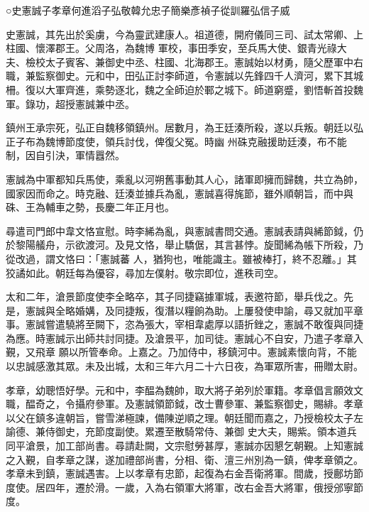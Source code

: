 
\begin{pinyinscope}

 ○史憲誠子孝章何進滔子弘敬韓允忠子簡樂彥禎子從訓羅弘信子威



 史憲誠，其先出於奚虜，今為靈武建康人。祖道德，開府儀同三司、試太常卿、上柱國、懷澤郡王。父周洛，為魏博
 軍校，事田季安，至兵馬大使、銀青光祿大夫、檢校太子賓客、兼御史中丞、柱國、北海郡王。憲誠始以材勇，隨父歷軍中右職，兼監察御史。元和中，田弘正討李師道，令憲誠以先鋒四千人濟河，累下其城柵。復以大軍齊進，乘勢逐北，魏之全師迫於鄆之城下。師道窮蹙，劉悟斬首投魏軍。錄功，超授憲誠兼中丞。



 鎮州王承宗死，弘正自魏移領鎮州。居數月，為王廷湊所殺，遂以兵叛。朝廷以弘正子布為魏博節度使，領兵討伐，俾復父冤。時幽
 州硃克融援助廷湊，布不能制，因自引決，軍情囂然。



 憲誠為中軍都知兵馬使，乘亂以河朔舊事動其人心，諸軍即擁而歸魏，共立為帥，國家因而命之。時克融、廷湊並據兵為亂，憲誠喜得旄節，雖外順朝旨，而中與硃、王為輔車之勢，長慶二年正月也。



 尋遣司門郎中韋文恪宣慰。時李絺為亂，與憲誠書問交通。憲誠表請與絺節鉞，仍於黎陽艤舟，示欲渡河。及見文恪，舉止驕倨，其言甚悖。旋聞絺為帳下所殺，乃從改過，謂文恪曰：「憲誠蕃
 人，猶狗也，唯能識主。雖被棒打，終不忍離。」其狡譎如此。朝廷每為優容，尋加左僕射。敬宗即位，進秩司空。



 太和二年，滄景節度使李全略卒，其子同捷竊據軍城，表邀符節，舉兵伐之。先是，憲誠與全略婚媾，及同捷叛，復潛以糧餉為助。上屢發使申諭，尋又就加平章事。憲誠嘗遣驍將至闕下，恣為張大，宰相韋處厚以語折銼之，憲誠不敢復與同捷為應。時憲誠示出師共討同捷。及滄景平，加司徒。憲誠心不自安，乃遣子孝章入覲，又飛章
 願以所管奉命。上嘉之。乃加侍中，移鎮河中。憲誠素懷向背，不能以忠誠感激其眾。未及出城，太和三年六月二十六日夜，為軍眾所害，冊贈太尉。



 孝章，幼聰悟好學。元和中，李醖為魏帥，取大將子弟列於軍籍。孝章倡言願效文職，醖奇之，令攝府參軍。及憲誠領節鉞，改士曹參軍、兼監察御史，賜緋。孝章以父在鎮多違朝旨，嘗雪涕極諫，備陳逆順之理。朝廷聞而嘉之，乃授檢校太子左諭德、兼侍御史，充節度副使。累遷至散騎常侍、兼御
 史大夫，賜紫。領本道兵同平滄景，加工部尚書。尋請赴闕，文宗慰勞甚厚，憲誠亦因懇乞朝覲。上知憲誠之入覲，自孝章之謀，遂加禮部尚書，分相、衛、澶三州別為一鎮，俾孝章領之。孝章未到鎮，憲誠遇害。上以孝章有忠節，起復為右金吾衛將軍。間歲，授鄜坊節度使。居四年，遷於滑。一歲，入為右領軍大將軍，改右金吾大將軍，俄授邠寧節度。




\end{pinyinscope}
